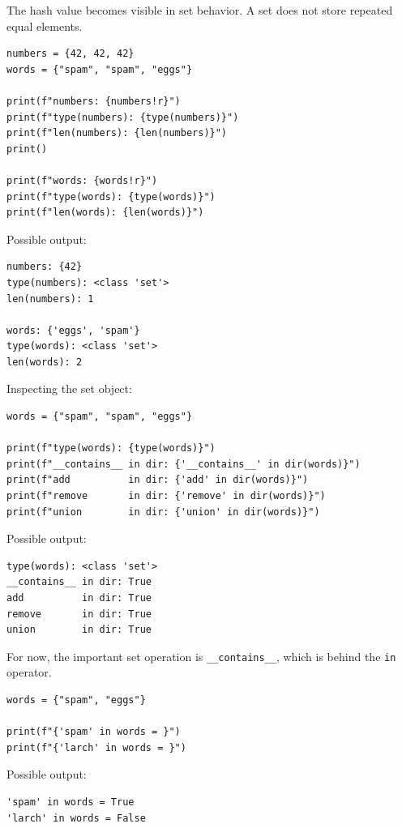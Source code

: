 The hash value becomes visible in set behavior. A set does not store repeated equal elements.

\begin{verbatim}
numbers = {42, 42, 42}
words = {"spam", "spam", "eggs"}

print(f"numbers: {numbers!r}")
print(f"type(numbers): {type(numbers)}")
print(f"len(numbers): {len(numbers)}")
print()

print(f"words: {words!r}")
print(f"type(words): {type(words)}")
print(f"len(words): {len(words)}")
\end{verbatim}

Possible output:

\begin{verbatim}
numbers: {42}
type(numbers): <class 'set'>
len(numbers): 1

words: {'eggs', 'spam'}
type(words): <class 'set'>
len(words): 2
\end{verbatim}

Inspecting the set object:

\begin{verbatim}
words = {"spam", "spam", "eggs"}

print(f"type(words): {type(words)}")
print(f"__contains__ in dir: {'__contains__' in dir(words)}")
print(f"add          in dir: {'add' in dir(words)}")
print(f"remove       in dir: {'remove' in dir(words)}")
print(f"union        in dir: {'union' in dir(words)}")
\end{verbatim}

Possible output:

\begin{verbatim}
type(words): <class 'set'>
__contains__ in dir: True
add          in dir: True
remove       in dir: True
union        in dir: True
\end{verbatim}

For now, the important set operation is \texttt{\_\_contains\_\_}, which is behind the \texttt{in} operator.

\begin{verbatim}
words = {"spam", "eggs"}

print(f"{'spam' in words = }")
print(f"{'larch' in words = }")
\end{verbatim}

Possible output:

\begin{verbatim}
'spam' in words = True
'larch' in words = False
\end{verbatim}

